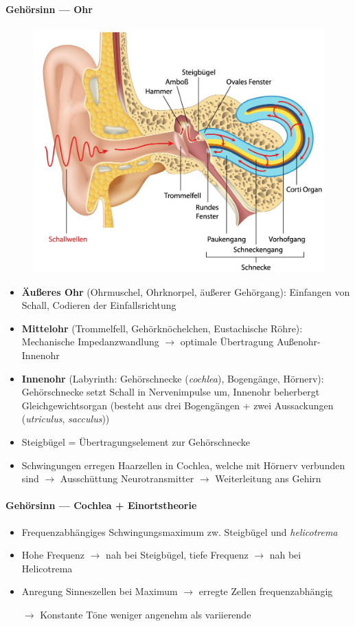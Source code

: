 \paragraph{Gehörsinn --- Ohr}
\begin{figure}[H]
  \centering
  \includegraphics[width=.585\linewidth]{assets/img/ohr.jpg}
\end{figure}
\begin{itemize}
  \item \textbf{Äußeres Ohr} (Ohrmuschel, Ohrknorpel, äußerer Gehörgang): Einfangen von Schall, Codieren der Einfallsrichtung
  \item \textbf{Mittelohr} (Trommelfell, Gehörknöchelchen, Eustachische Röhre): Mechanische Impedanzwandlung \( \to \) optimale Übertragung Außenohr-Innenohr
  \item \textbf{Innenohr} (Labyrinth: Gehörschnecke (\emph{cochlea}), Bogengänge, Hörnerv): Gehörschnecke setzt Schall in Nervenimpulse um, Innenohr beherbergt Gleichgewichtsorgan (besteht aus drei Bogengängen + zwei Aussackungen (\emph{utriculus}, \emph{sacculus}))
  \item Steigbügel = Übertragungselement zur Gehörschnecke
  \item Schwingungen erregen Haarzellen in Cochlea, welche mit Hörnerv verbunden sind \( \to \) Ausschüttung Neurotransmitter \( \to \) Weiterleitung ans Gehirn
\end{itemize}

\paragraph{Gehörsinn --- Cochlea + Einortstheorie}
\begin{itemize}
  \item Frequenzabhängiges Schwingungsmaximum zw. Steigbügel und \emph{helicotrema}
  \item Hohe Frequenz \( \to \) nah bei Steigbügel, tiefe Frequenz \( \to \) nah bei Helicotrema
  \item Anregung Sinneszellen bei Maximum \( \to \) erregte Zellen frequenzabhängig
  \item[\( \to \)] Konstante Töne weniger angenehm als variierende
\end{itemize}

